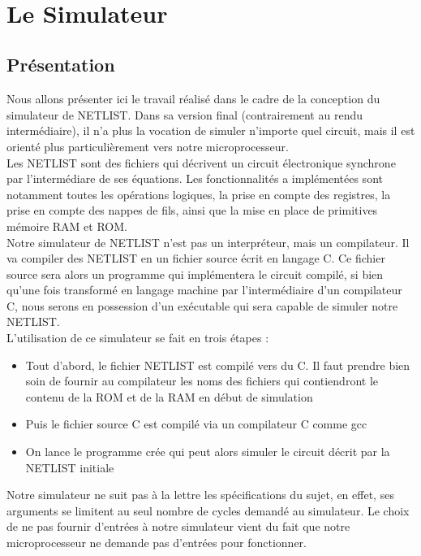 \documentclass[a4paper, 12pt, twoside]{report}
\begin{document}
\newpage~
\newpage~


\section{Le Simulateur}

\subsection{Présentation}

Nous allons présenter ici le travail réalisé dans le cadre de la conception du simulateur 
de NETLIST. Dans sa version final (contrairement au rendu intermédiaire), il n'a plus 
la vocation de simuler n'importe quel circuit, mais il est orienté plus particulièrement 
vers notre microprocesseur.\\

Les NETLIST sont des fichiers qui décrivent un circuit électronique synchrone par 
l'intermédiare de ses équations. Les fonctionnalités a implémentées sont notamment 
toutes les opérations logiques, la prise en compte des registres, la prise en 
compte des nappes de fils, ainsi que la mise en place de primitives mémoire RAM et 
ROM.\\

Notre simulateur de NETLIST n'est pas un interpréteur, mais un compilateur. Il va 
compiler des NETLIST en un fichier source écrit en langage C. Ce fichier source 
sera alors un programme qui implémentera le circuit compilé, si bien qu'une fois 
transformé en langage machine par l'intermédiaire d'un compilateur C, nous serons 
en possession d'un exécutable qui sera capable de simuler notre NETLIST.\\

L'utilisation de ce simulateur se fait en trois étapes :
\begin{itemize}
\item Tout d'abord, le fichier NETLIST est compilé vers du C. Il faut prendre bien soin de 
      fournir au compilateur les noms des fichiers qui contiendront le contenu de la ROM et 
      de la RAM en début de simulation
\item Puis le fichier source C est compilé via un compilateur C comme gcc
\item On lance le programme crée qui peut alors simuler le circuit décrit par la NETLIST initiale\\
\end{itemize}

Notre simulateur ne suit pas à la lettre les spécifications du sujet, en effet, ses arguments 
se limitent au seul nombre de cycles demandé au simulateur. Le choix de ne pas fournir d'entrées 
à notre simulateur vient du fait que notre microprocesseur ne demande pas d'entrées pour fonctionner.\\
\end{document}
